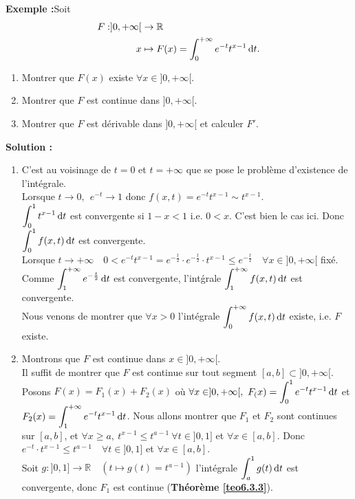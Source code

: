 \documentclass[11pt, a4paper]{book}
\begin{document}
\textbf{Exemple :}\quad Soit \begin{align*}
F:]0,+\infty[&\rightarrow\mathbb{R}\\ x&\mapsto F(x)=\int_0^{+\infty}e^{-t}t^{x-1}\,\mathrm{d} t.
\end{align*} 
\begin{enumerate}
\item Montrer que $F(x)$ existe $\forall x\in ]0,+\infty[.$ 
\item Montrer que $F$ est continue dans  $]0,+\infty[.$
\item Montrer que $F$ est d\'erivable dans $]0,+\infty[$ et calculer $F'.$
\end{enumerate}
\textbf{Solution :}\quad
\begin{enumerate}
\item C'est au voisinage de $t=0$ et $t=+\infty$ que se pose le probl\`eme d'existence de l'int\'egrale.\\
Lorsque $t\rightarrow0,~~e^{-t}\rightarrow1$ donc $f(x,t)=e^{-t}t^{x-1}\sim t^{x-1}.$\\
${\displaystyle \int_0^1t^{x-1}\,\mathrm{d} t}$ est convergente si $1-x<1$ i.e. $0<x$. C'est bien le cas ici. Donc ${\displaystyle \int_0^1f(x,t)\,\mathrm{d} t}$ est convergente. \\
Lorsque $t\rightarrow+\infty\quad 0<e^{-t}t^{x-1}=e^{-\frac{t}{2}}\cdot e^{-\frac{t}{2}}\cdot t^{x-1} \leq e^{-\frac{t}{2}}\quad\forall x\in ]0,+\infty[$ fix\'e.
 Comme ${\displaystyle \int_1^{+\infty}e^{-\frac{t}{2}}\,\mathrm{d} t}$ est convergente,
  l'int\'grale ${\displaystyle \int_1^{+\infty}f(x,t)\,\mathrm{d} t}$ est convergente.\\
Nous venons de montrer que $\forall x>0$ l'int\'egrale ${\displaystyle \int_0^{+\infty}f(x,t)\,\mathrm{d} t}$ existe, i.e. $F$ existe.
\item Montrons que $F$ est continue dans $x\in ]0,+\infty[.$\\
Il suffit de montrer que $F$ est continue sur tout segment $[a,b]\subset ]0,+\infty[.$ \\
Posons $F(x)=F_1(x)+F_2(x)$ o\`u $\forall x\in ]0,+\infty[,~{\displaystyle F_(x)=\int_0^1e^{-t}t^{x-1}\,\mathrm{d} t}$ et ${\displaystyle F_2(x)=\int_1^{+\infty}e^{-t}t^{x-1}\,\mathrm{d} t}$. Nous allons montrer que $F_1$ et $F_2$ sont continues sur $[a,b]$, et $\forall x\geq a,~t^{x-1}\leq t^{a-1}~\forall t\in ]0,1]$ et $\forall x\in [a,b]$. Donc $e^{-t}\cdot t^{x-1}\leq t^{a-1}\quad \forall t\in ]0,1]$ et $\forall x\in [a,b]$. \\
Soit $g:]0,1]\rightarrow\mathbb{R}\quad(t\mapsto g(t)=t^{a-1})$ l'int\'egrale ${\displaystyle \int_a^1g(t)\,\mathrm{d} t}$ est convergente, donc $F_1$ est continue (\textbf{Th\'eor\`eme \ref{teo6.3.3}}).\\

\end{enumerate}
\end{document}
